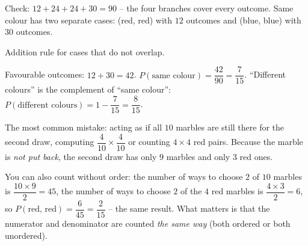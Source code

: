 {\begin{center}
\begin{tikzpicture}
\end{tikzpicture}\end{center}
Check: $12+24+24+30=90$ \checkmark{} -- the four branches cover every outcome.
Same colour has two separate cases: (red, red) with $12$ outcomes and (blue, blue) with $30$ outcomes.
\begin{recallbox}Addition rule for cases that do not overlap.\end{recallbox}
Favourable outcomes: $12+30=42$. $P(\text{same colour})=\dfrac{42}{90}=\dfrac{7}{15}$.
``Different colours'' is the complement of ``same colour'': $P(\text{different colours})=1-\dfrac{7}{15}=\dfrac{8}{15}$.
\begin{warnbox}The most common mistake: acting as if all $10$ marbles are still there for the second draw, computing $\dfrac{4}{10}\times\dfrac{4}{10}$ or counting $4\times4$ red pairs. Because the marble is \emph{not put back}, the second draw has only $9$ marbles and only $3$ red ones.\end{warnbox}
\begin{tipbox}You can also count without order: the number of ways to choose $2$ of $10$ marbles is $\dfrac{10\times9}{2}=45$, the number of ways to choose $2$ of the $4$ red marbles is $\dfrac{4\times3}{2}=6$, so $P(\text{red, red})=\dfrac{6}{45}=\dfrac{2}{15}$ -- the same result. What matters is that the numerator and denominator are counted \emph{the same way} (both ordered or both unordered).\end{tipbox}
}
